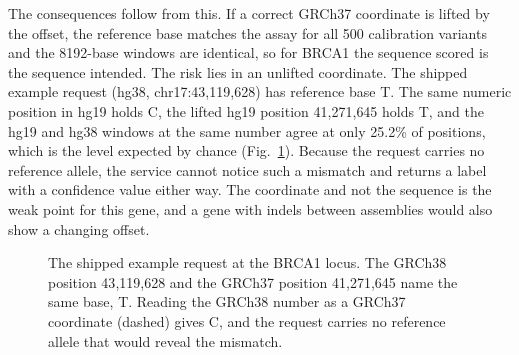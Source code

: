 \documentclass[10pt,journal,a4paper]{IEEEtran}
\begin{document}
The consequences follow from this. If a correct GRCh37 coordinate is lifted by the offset, the reference base matches the assay for all 500 calibration variants and the 8192-base windows are identical, so for BRCA1 the sequence scored is the sequence intended. The risk lies in an unlifted coordinate. The shipped example request (hg38, chr17:43{,}119{,}628) has reference base T. The same numeric position in hg19 holds C, the lifted hg19 position 41{,}271{,}645 holds T, and the hg19 and hg38 windows at the same number agree at only 25.2\% of positions, which is the level expected by chance (Fig.~\ref{fig:assembly}). Because the request carries no reference allele, the service cannot notice such a mismatch and returns a label with a confidence value either way. The coordinate and not the sequence is the weak point for this gene, and a gene with indels between assemblies would also show a changing offset.

\begin{figure}[!t]
\centering
{}
\caption{The shipped example request at the BRCA1 locus. The GRCh38 position 43{,}119{,}628 and the GRCh37 position 41{,}271{,}645 name the same base, T. Reading the GRCh38 number as a GRCh37 coordinate (dashed) gives C, and the request carries no reference allele that would reveal the mismatch.}
\label{fig:assembly}
\end{figure}
\end{document}
